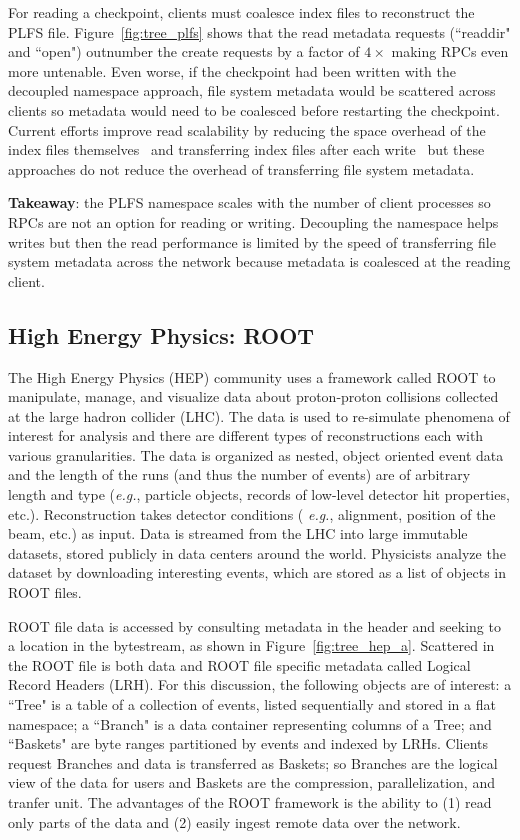 For reading a checkpoint, clients must coalesce index files to reconstruct the
PLFS file. Figure~\ref{fig:tree_plfs} shows that the read metadata requests
(``readdir" and ``open") outnumber the create requests by a factor of
\(4\times\) making RPCs even more untenable. Even worse, if the checkpoint had
been written with the decoupled namespace approach, file system metadata would
be scattered across clients so metadata would need to be coalesced before
restarting the checkpoint.  Current efforts improve read scalability by
reducing the space overhead of the index files
themselves~\cite{he:hpdc13-plfs-patterns} and transferring index files after
each write~\cite{grider:pc17-diddlings} but these approaches do not reduce the
overhead of transferring file system metadata.

\textbf{Takeaway}: the PLFS namespace scales with the number of client
processes so RPCs are not an option for reading or writing.  Decoupling the
namespace helps writes but then the read performance is limited by the speed of
transferring file system metadata across the network because metadata is
coalesced at the reading client.

\subsection{High Energy Physics: ROOT}

The High Energy Physics (HEP) community uses a framework called ROOT to
manipulate, manage, and visualize data about proton-proton collisions collected
at the large hadron collider (LHC). The data is used to re-simulate phenomena
of interest for analysis and there are different types of reconstructions each
with various granularities. The data is organized as nested, object oriented
event data and the length of the runs (and thus the number of events) are of
arbitrary length and type ({\it e.g.}, particle objects, records of low-level
detector hit properties, etc.).  Reconstruction takes detector conditions ({\it
e.g.}, alignment, position of the beam, etc.) as input.  Data is streamed from
the LHC into large immutable datasets, stored publicly in data centers around
the world.  Physicists analyze the dataset by downloading interesting events,
which are stored as a list of objects in ROOT files.

ROOT file data is accessed by consulting metadata in the header and seeking to
a location in the bytestream, as shown in Figure~\ref{fig:tree_hep_a}.
Scattered in the ROOT file is both data and ROOT file specific metadata called
Logical Record Headers (LRH).  For this discussion, the following objects are
of interest: a ``Tree" is a table of a collection of events, listed
sequentially and stored in a flat namespace; a ``Branch" is a data container
representing columns of a Tree; and ``Baskets" are byte ranges partitioned by
events and indexed by LRHs.  Clients request Branches and data is transferred
as Baskets; so Branches are the logical view of the data for users and Baskets
are the compression, parallelization, and tranfer unit.  The advantages of the
ROOT framework is the ability to (1) read only parts of the data and (2) easily
ingest remote data over the network.  

